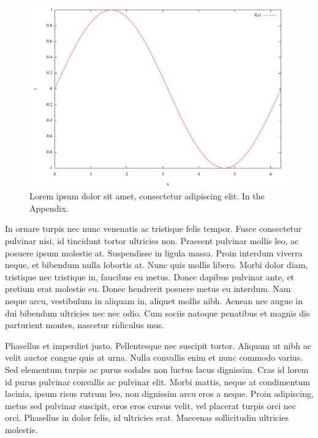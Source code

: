\documentclass[final,los,index,glossary,loa]{ryethesis}
\begin{document}
{\begin{figure}
\begin{center}
\includegraphics[width=\textwidth,keepaspectratio=true]{figure1.pdf}
\caption{Lorem ipsum dolor sit amet, consectetur adipiscing elit. In the Appendix.}\label{fig::A1}
\end{center}
\end{figure}

In ornare turpis nec nunc venenatis ac tristique felis tempor. Fusce consectetur pulvinar nisi, id tincidunt tortor ultricies non. Praesent pulvinar mollis leo, ac posuere ipsum molestie at. Suspendisse in ligula massa. Proin interdum viverra neque, et bibendum nulla lobortis at. Nunc quis mollis libero. Morbi dolor diam, tristique nec tristique in, faucibus eu metus. Donec dapibus pulvinar ante, et pretium erat molestie eu. Donec hendrerit posuere metus eu interdum. Nam neque arcu, vestibulum in aliquam in, aliquet mollis nibh. Aenean nec augue in dui bibendum ultricies nec nec odio. Cum sociis natoque penatibus et magnis dis parturient montes, nascetur ridiculus mus.

Phasellus et imperdiet justo. Pellentesque nec suscipit tortor. Aliquam ut nibh ac velit auctor congue quis at urna. Nulla convallis enim et nunc commodo varius. Sed elementum turpis ac purus sodales non luctus lacus dignissim. Cras id lorem id purus pulvinar convallis ac pulvinar elit. Morbi mattis, neque at condimentum lacinia, ipsum risus rutrum leo, non dignissim arcu eros a neque. Proin adipiscing, metus sed pulvinar suscipit, eros eros cursus velit, vel placerat turpis orci nec orci. Phasellus in dolor felis, id ultricies erat. Maecenas sollicitudin ultricies molestie.

}
\end{document}
